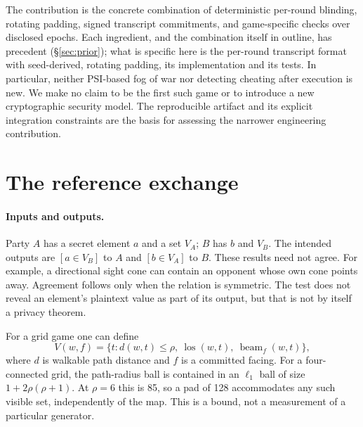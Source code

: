 \documentclass[11pt]{article}
\begin{document}
The contribution is the concrete combination of deterministic per-round
blinding, rotating padding, signed transcript commitments, and game-specific
checks over disclosed epochs. Each ingredient, and the combination itself in
outline, has precedent (\S\ref{sec:prior}); what is specific here is the
per-round transcript format with seed-derived, rotating padding, its
implementation and its tests. In particular, neither PSI-based fog of war nor
detecting cheating after execution is new. We make no claim to be the first such game or
to introduce a new cryptographic security model. The reproducible artifact and
its explicit integration constraints are the basis for assessing the narrower
engineering contribution.

\section{The reference exchange}
\label{sec:protocol}

\paragraph{Inputs and outputs.}
Party $A$ has a secret element $a$ and a set $V_A$; $B$ has $b$ and $V_B$.
The intended outputs are $[a\in V_B]$ to $A$ and $[b\in V_A]$ to $B$.
These results need not agree. For example, a directional sight cone can contain
an opponent whose own cone points away. Agreement follows only when the
relation is symmetric. The test does not reveal an element's plaintext value
as part of its output, but that is not by itself a privacy theorem.

For a grid game one can define
\[
 V(w,f)=\{t:d(w,t)\leq\rho,\ \operatorname{los}(w,t),\
                 \operatorname{beam}_f(w,t)\},
\]
where $d$ is walkable path distance and $f$ is a committed facing. For a
four-connected grid, the path-radius ball is contained in an $\ell_1$ ball of
size $1+2\rho(\rho+1)$. At $\rho=6$ this is 85, so a pad of 128 accommodates
any such visible set, independently of the map. This is a bound, not a
measurement of a particular generator.
\end{document}
